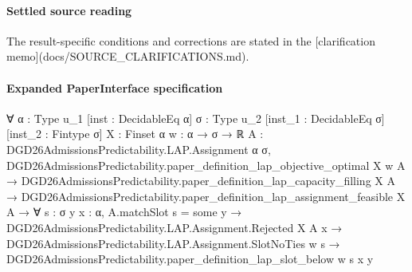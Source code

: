 \documentclass[10pt]{article}
\begin{document}
\paragraph{Settled source reading}
The result-\allowbreak{}specific conditions and corrections are stated in the [clarification memo](docs/\allowbreak{}SOURCE\_\allowbreak{}CLARIFICATIONS.\allowbreak{}md).\allowbreak{}

\paragraph{Expanded PaperInterface specification}
\begin{ReviewVerbatim}
∀ {α : Type u_1} [inst : DecidableEq α] {σ : Type u_2} [inst_1 : DecidableEq σ] [inst_2 : Fintype σ] {X : Finset α}
  {w : α → σ → ℝ} {A : DGD26AdmissionsPredictability.LAP.Assignment α σ},
  DGD26AdmissionsPredictability.paper_definition_lap_objective_optimal X w A →
    DGD26AdmissionsPredictability.paper_definition_lap_capacity_filling X A →
      DGD26AdmissionsPredictability.paper_definition_lap_assignment_feasible X A →
        ∀ {s : σ} {y x : α},
          A.matchSlot s = some y →
            DGD26AdmissionsPredictability.LAP.Assignment.Rejected X A x →
              DGD26AdmissionsPredictability.LAP.Assignment.SlotNoTies w s →
                DGD26AdmissionsPredictability.paper_definition_lap_slot_below w s x y
\end{ReviewVerbatim}
\end{document}
